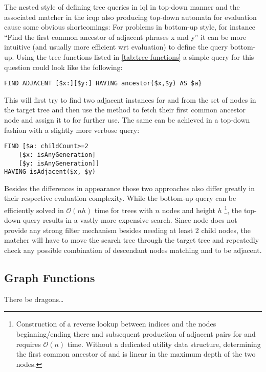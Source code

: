 \documentclass[11pt,a4paper]{article}
\begin{document}
The nested style of defining tree queries in \ac{iql} in top-down manner and the associated matcher in the \ac{icqp} also producing top-down automata for evaluation cause some obvious shortcomings:
For problems in bottom-up style, for instance ``Find the first common ancestor of adjacent phrases x and y'' it can be more intuitive (and usually more efficient wrt evaluation) to define the query bottom-up.
Using the tree functions listed in \cref{tab:tree-functions} a simple query for this question could look like the following: 
\begin{Verbatim}[samepage=true]
FIND ADJACENT [$x:][$y:] HAVING ancestor($x,$y) AS $a}
\end{Verbatim}
This will first try to find two adjacent instances for  and  from the set of nodes in the target tree and then use the  method to fetch their first common ancestor node and assign it to  for further use.
The same can be achieved in a top-down fashion with a slightly more verbose query:
\begin{Verbatim}[samepage=true]
FIND [$a: childCount>=2
    [$x: isAnyGeneration] 
    [$y: isAnyGeneration]]
HAVING isAdjacent($x, $y)
\end{Verbatim}
Besides the differences in appearance those two approaches also differ greatly in their respective evaluation complexity.
While the bottom-up query can be efficiently solved in $\mathcal{O}(nh)$ time for trees with $n$ nodes and height $h$ \footnote{Construction of a reverse lookup between indices and the nodes beginning/ending there and subsequent production of adjacent pairs for  and  requires $\mathcal{O}(n)$ time. Without a dedicated utility data structure, determining the first common ancestor of  and  is linear in the maximum depth of the two nodes.}, the top-down query results in a vastly more expensive search.
Since node  does not provide any strong filter mechanism besides needing at least 2 child nodes, the matcher will have to move the search tree through the target tree and repeatedly check any possible combination of descendant nodes matching  and  to be adjacent.

\subsection{Graph Functions}
\label{sec:graph-functions}

There be dragons\dots
\end{document}
